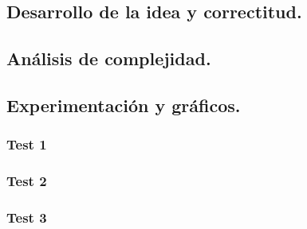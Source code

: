 \subsection{Desarrollo de la idea y correctitud.}





\subsection{Análisis de complejidad.}

\vspace*{0.3cm}


\vspace*{0.6cm}

\subsection{Experimentación y gráficos.}

\vspace*{0.3cm}


\subsubsection{Test 1}

\vspace*{0.3cm}


\vspace*{0.6cm}

\subsubsection{Test 2}

\vspace*{0.3cm}


\vspace*{0.6cm}

\subsubsection{Test 3}

\vspace*{0.3cm}

